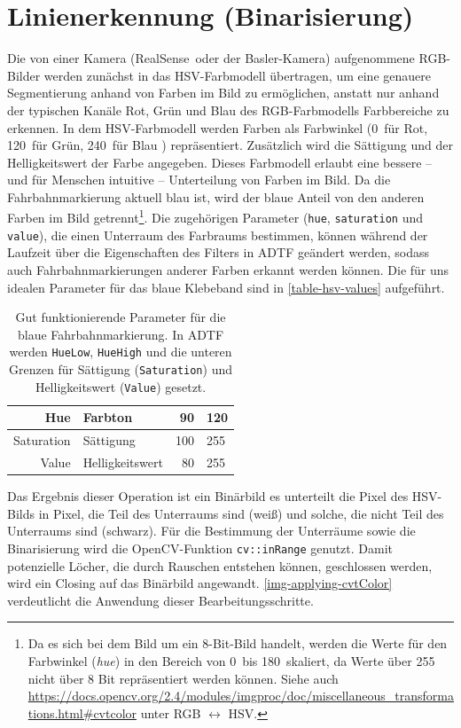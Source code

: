 \documentclass[a4paper,12pt]{report}
\begin{document}
\section{Linienerkennung (Binarisierung)}
	Die von einer Kamera (RealSense\texttrademark\ oder der Basler-Kamera) aufgenommene RGB-Bilder werden zunächst in das HSV-Farbmodell übertragen, um eine genauere Segmentierung anhand von Farben im Bild zu ermöglichen, anstatt nur anhand der typischen Kanäle Rot, Grün und Blau des RGB-Farbmodells Farbbereiche zu erkennen.
	In dem HSV-Farbmodell werden Farben als Farbwinkel (0\degree\ für Rot, 120\degree\ für Grün, 240\degree\ für Blau \cite{HSV-Wiki}) repräsentiert. Zusätzlich wird die Sättigung und der Helligkeitswert der Farbe angegeben.
	Dieses Farbmodell erlaubt eine bessere -- und für Menschen intuitive -- Unterteilung von Farben im Bild.
	Da die Fahrbahnmarkierung aktuell blau ist, wird der blaue Anteil von den anderen Farben im Bild getrennt\footnote{Da es sich bei dem Bild um ein 8-Bit-Bild handelt, werden die Werte für den Farbwinkel (\textit{hue}) in den Bereich von 0\degree\ bis 180\degree\ skaliert, da Werte über 255 nicht über 8 Bit repräsentiert werden können.
	Siehe auch \url{https://docs.opencv.org/2.4/modules/imgproc/doc/miscellaneous_transformations.html\#cvtcolor} unter RGB $\longleftrightarrow$ HSV.}.
	Die zugehörigen Parameter (\texttt{hue}, \texttt{saturation} und \texttt{value}), die einen Unterraum des Farbraums bestimmen, können während der Laufzeit über die Eigenschaften des Filters in ADTF geändert werden, sodass auch Fahrbahnmarkierungen anderer Farben erkannt werden können.
	Die für uns idealen Parameter für das blaue Klebeband sind in \autoref{table-hsv-values} aufgeführt.

	\begin{table}
		\centering
		\begin{tabular}{r@{\,/\,}l|r@{$-$}l}
			Hue & Farbton & 90 & 120\\\hline
			Saturation & Sättigung & 100 & 255\\\hline
			Value & Helligkeitswert & 80 & 255
		\end{tabular}
		\caption{Gut funktionierende Parameter für die blaue Fahrbahnmarkierung. In ADTF werden \texttt{HueLow}, \texttt{HueHigh} und die unteren Grenzen für Sättigung (\texttt{Saturation}) und Helligkeitswert (\texttt{Value}) gesetzt.}
		\label{table-hsv-values}
	\end{table}

	Das Ergebnis dieser Operation ist ein Binärbild es unterteilt die Pixel des HSV-Bilds in Pixel, die Teil des Unterraums sind (weiß) und solche, die nicht Teil des Unterraums sind (schwarz).
	Für die Bestimmung der Unterräume sowie die Binarisierung wird die OpenCV-Funktion \texttt{cv::inRange} genutzt.
	Damit potenzielle Löcher, die durch Rauschen entstehen können, geschlossen werden, wird ein Closing auf das Binärbild angewandt.
	\autoref{img-applying-cvtColor} verdeutlicht die Anwendung dieser Bearbeitungsschritte.
\end{document}
